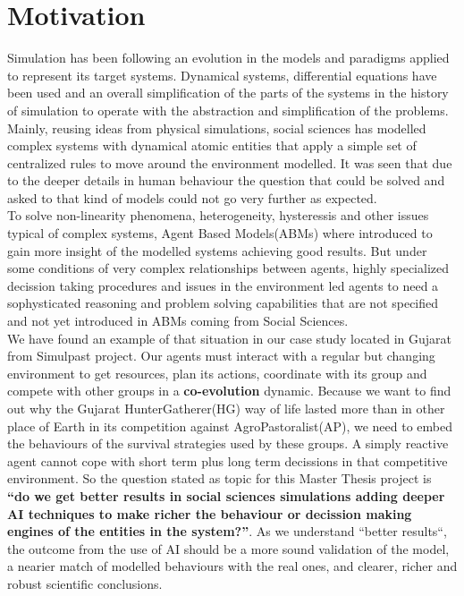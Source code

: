 \documentclass[11pt,oneside,a4paper,openright]{report}
\begin{document}

\section{Motivation}

Simulation has been following an evolution in the models and paradigms applied to represent its target
systems. Dynamical systems, differential equations have been used and an overall simplification of the parts of the systems in the history of simulation to operate with the abstraction and simplification of the problems.
Mainly, reusing ideas from physical simulations, social sciences has modelled complex systems with dynamical
atomic entities that apply a simple set of centralized rules to move around the environment modelled. It was seen that due to the deeper details in human behaviour the question that could be solved and asked to that kind of models could not go very further as expected.\\ 

To solve non-linearity phenomena, heterogeneity, hysteressis and other issues typical of complex systems, Agent Based Models(ABMs) where introduced to gain more insight of the modelled systems achieving good results. But under 
some conditions of very complex relationships between agents, highly specialized decission taking procedures
and issues in the environment led agents to need a sophysticated reasoning and problem solving capabilities
that are not specified and not yet introduced in ABMs coming from Social Sciences.\\ 

We have found an example of that situation in our case study located in Gujarat from Simulpast project. Our agents must interact with a regular but changing environment to get resources, plan its actions, coordinate with its group and compete with other groups in a \textbf{co-evolution} dynamic. Because we want to find out why the Gujarat HunterGatherer(HG) way of life lasted more than in other place of Earth in its competition against AgroPastoralist(AP), we need to embed the behaviours of the survival strategies used by these groups. A simply reactive agent cannot cope with short term plus long term decissions in that competitive environment. So the question stated as topic for this Master Thesis project is \textbf{``do we get better results in social sciences simulations adding deeper AI techniques to make richer the behaviour or decission making engines of the entities in the system?''}. As we understand ``better results``, the outcome from the use of AI should be a more sound validation of the model, a nearier match of modelled behaviours with the real ones, and clearer, richer and robust scientific conclusions.\\
\end{document}
